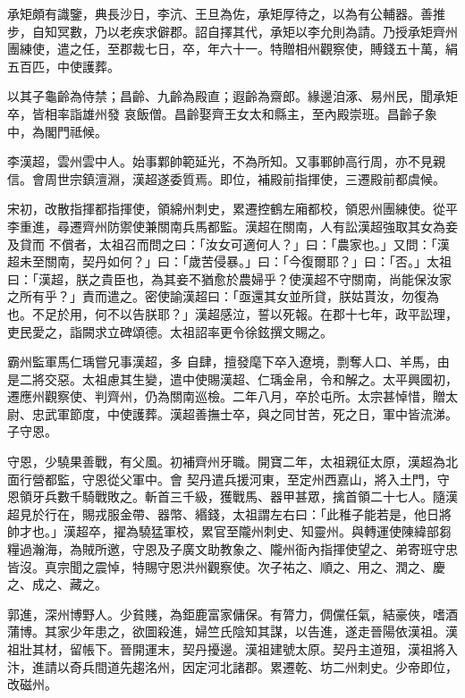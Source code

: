 \begin{pinyinscope}
 承矩頗有識鑒，典長沙日，李沆、王旦為佐，承矩厚待之，以為有公輔器。善推步，自知冥數，乃以老疾求僻郡。詔自擇其代，承矩以李允則為請。乃授承矩齊州團練使，遣之任，至郡裁七日，卒，年六十一。特贈相州觀察使，賻錢五十萬，絹五百匹，中使護葬。



 以其子龜齡為侍禁；昌齡、九齡為殿直；遐齡為齋郎。緣邊洎涿、易州民，聞承矩卒，皆相率詣雄州發
 哀飯僧。昌齡娶齊王女太和縣主，至內殿崇班。昌齡子象中，為閣門祗候。



 李漢超，雲州雲中人。始事鄴帥範延光，不為所知。又事鄆帥高行周，亦不見親信。會周世宗鎮澶淵，漢超遂委質焉。即位，補殿前指揮使，三遷殿前都虞候。



 宋初，改散指揮都指揮使，領綿州刺史，累遷控鶴左廂都校，領恩州團練使。從平李重進，尋遷齊州防禦使兼關南兵馬都監。漢超在關南，人有訟漢超強取其女為妾及貸而
 不償者，太祖召而問之曰：「汝女可適何人？」曰：「農家也。」又問：「漢超未至關南，契丹如何？」曰：「歲苦侵暴。」曰：「今復爾耶？」曰：「否。」太祖曰：「漢超，朕之貴臣也，為其妾不猶愈於農婦乎？使漢超不守關南，尚能保汝家之所有乎？」責而遣之。密使諭漢超曰：「亟還其女並所貸，朕姑貰汝，勿復為也。不足於用，何不以告朕耶？」漢超感泣，誓以死報。在郡十七年，政平訟理，吏民愛之，詣闕求立碑頌德。太祖詔率更令徐鉉撰文賜之。



 霸州監軍馬仁瑀嘗兄事漢超，多
 自肆，擅發麾下卒入遼境，剽奪人口、羊馬，由是二將交惡。太祖慮其生變，遣中使賜漢超、仁瑀金帛，令和解之。太平興國初，遷應州觀察使、判齊州，仍為關南巡檢。二年八月，卒於屯所。太宗甚悼惜，贈太尉、忠武軍節度，中使護葬。漢超善撫士卒，與之同甘苦，死之日，軍中皆流涕。子守恩。



 守恩，少驍果善戰，有父風。初補齊州牙職。開寶二年，太祖親征太原，漢超為北面行營都監，守恩從父軍中。會
 契丹遣兵援河東，至定州西嘉山，將入土門，守恩領牙兵數千騎戰敗之。斬首三千級，獲戰馬、器甲甚眾，擒首領二十七人。隨漢超見於行在，賜戎服金帶、器幣、緡錢，太祖謂左右曰：「此稚子能若是，他日將帥才也。」漢超卒，擢為驍猛軍校，累官至隴州刺史、知靈州。與轉運使陳緯部芻糧過瀚海，為賊所邀，守恩及子廣文助教象之、隴州衙內指揮使望之、弟寄班守忠皆沒。真宗聞之震悼，特賜守恩洪州觀察使。次子祐之、順之、用之、潤之、慶
 之、成之、藏之。



 郭進，深州博野人。少貧賤，為鉅鹿富家傭保。有膂力，倜儻任氣，結豪俠，嗜酒蒲博。其家少年患之，欲圖殺進，婦竺氏陰知其謀，以告進，遂走晉陽依漢祖。漢祖壯其材，留帳下。晉開運末，契丹擾邊。漢祖建號太原。契丹主道殂，漢祖將入汴，進請以奇兵間道先趨洺州，因定河北諸郡。累遷乾、坊二州刺史。少帝即位，改磁州。




\end{pinyinscope}

